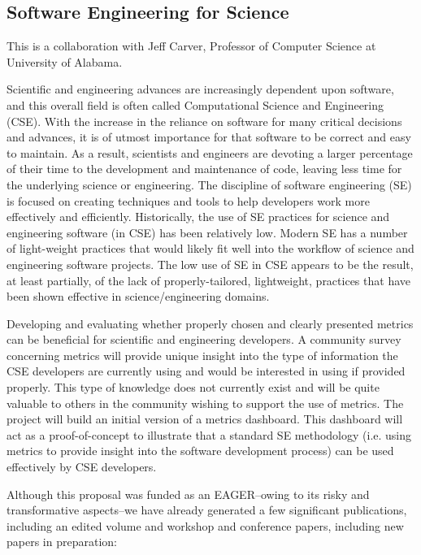 \subsection{Software Engineering for Science}

This is a collaboration with Jeff Carver, Professor of Computer Science at University of Alabama.
\vspace{5pt}

Scientific and engineering advances are increasingly dependent upon software, and this overall field is often called Computational Science and Engineering (CSE). With the increase in the reliance on software for many critical decisions and advances, it is of utmost importance for that software to be correct and easy to maintain. As a result, scientists and engineers are devoting a larger percentage of their time to the development and maintenance of code, leaving less time for the underlying science or engineering. The discipline of software engineering (SE) is focused on creating techniques and tools to help developers work more effectively and efficiently. Historically, the use of SE practices for science and engineering software (in CSE) has been relatively low. Modern SE has a number of light-weight practices that would likely fit well into the workflow of science and engineering software projects. The low use of SE in CSE appears to be the result, at least partially, of the lack of properly-tailored, lightweight, practices that have been shown effective in science/engineering domains.
\vspace{5pt}

Developing and evaluating whether properly chosen and clearly presented metrics can be beneficial for scientific and engineering developers. A community survey concerning metrics will provide unique insight into the type of information the CSE developers are currently using and would be interested in using if provided properly. This type of knowledge does not currently exist and will be quite valuable to others in the community wishing to support the use of metrics. The project will build an initial version of a metrics dashboard. This dashboard will act as a proof-of-concept to illustrate that a standard SE methodology (i.e. using metrics to provide insight into the software development process) can be used effectively by CSE developers.
\vspace{5pt}

Although this proposal was funded as an EAGER--owing to its risky and transformative aspects--we have already generated a few significant publications, including an edited volume and workshop and conference papers, including new papers in preparation:

\begin{refsection}
\nocite{eisty_escience2018_software_metrics_survey}
\nocite{jeffrey_carver_software_2013}
\nocite{jeffrey_carver_software_2017}
\printbibliography[heading=none]
\end{refsection}